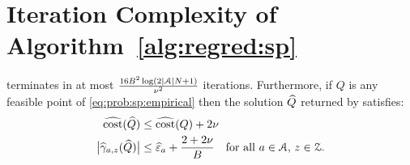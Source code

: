 \section{Iteration Complexity of Algorithm~\ref{alg:regred:sp}}

\begin{theorem}
\label{thm:alg:sp}
 terminates in at most $\frac{16 B^2\log(2\lvert\mathcal{A}\rvert N+1)}{\nu^2}$ iterations. Furthermore,
if $Q$ is any feasible point of \eqref{eq:prob:sp:empirical} then the solution $\widehat{Q}$ returned by  satisfies:
%
\begin{align*}
   \widehat{\textup{\mdseries cost}}(\widehat{Q})
   &\le
   \widehat{\textup{\mdseries cost}}(Q)+2\nu
\\
   \bigl\lvert\widehat{\gamma}_{a,z}(\widehat{Q})\bigr\rvert
   &\le\widehat{\varepsilon}_{a}+\frac{2+2\nu}{B}
\quad
\text{for all $a\in\mathcal{A}$, $z\in\mathcal{Z}$.}
\end{align*}
\end{theorem}

